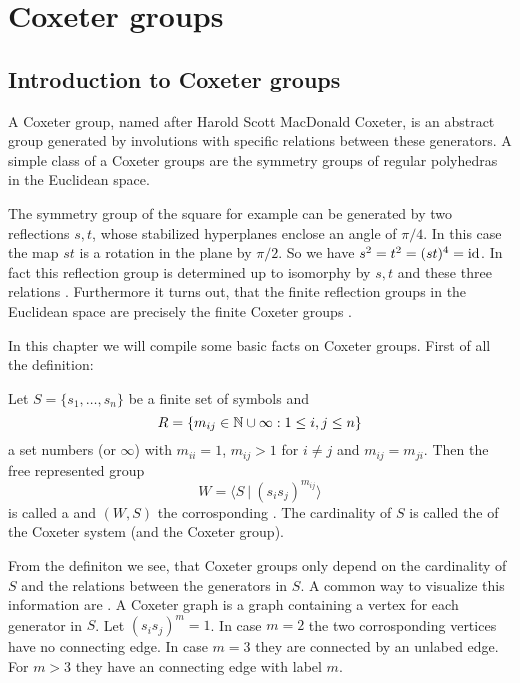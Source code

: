 \section{Coxeter groups}

\subsection{Introduction to Coxeter groups}

A Coxeter group, named after Harold Scott MacDonald Coxeter, is an abstract group generated by involutions with specific relations between these generators. A simple class of a Coxeter groups are the symmetry groups of regular polyhedras in the Euclidean space.

The symmetry group of the square for example can be generated by two reflections $s,t$, whose stabilized hyperplanes enclose an angle of $\pi / 4$. In this case the map $st$ is a rotation in the plane by $\pi / 2$. So we have $s^2 = t^2 = (st)^4 = \operatorname{id}$. In fact this reflection group is determined up to isomorphy by $s,t$ and these three relations \cite[Theorem 1.9]{humphreys:coxeter}. Furthermore it turns out, that the finite reflection groups in the Euclidean space are precisely the finite Coxeter groups \cite[Theorem 6.4]{humphreys:coxeter}.

In this chapter we will compile some basic facts on Coxeter groups. First of all the definition:

\begin{defi}
	\label{coxeter-system}
	Let $S = \{ s_1, \ldots, s_n \}$ be a finite set of symbols and
	$$R = \{ m_{ij} \in \mathbb{N} \cup \infty : 1 \leq i,j \leq n \}$$
	a set numbers (or $\infty$) with $m_{ii} = 1$, $m_{ij} > 1$ for $i \neq j$ and $m_{ij} = m_{ji}$. Then the free represented group
	$$W = \langle S \ | \ (s_i s_j)^{m_{ij}} \rangle$$
	is called a  and $(W,S)$ the corrosponding . The cardinality of $S$ is called the  of the Coxeter system (and the Coxeter group).
\end{defi}

From the definiton we see, that Coxeter groups only depend on the cardinality of $S$ and the relations between the generators in $S$. A common way to visualize this information are . A Coxeter graph is a graph containing a vertex for each generator in $S$. Let $(s_i s_j)^m = 1$. In case $m = 2$ the two corrosponding vertices have no connecting edge. In case $m = 3$ they are connected by an unlabed edge. For $m > 3$ they have an connecting edge with label $m$.

